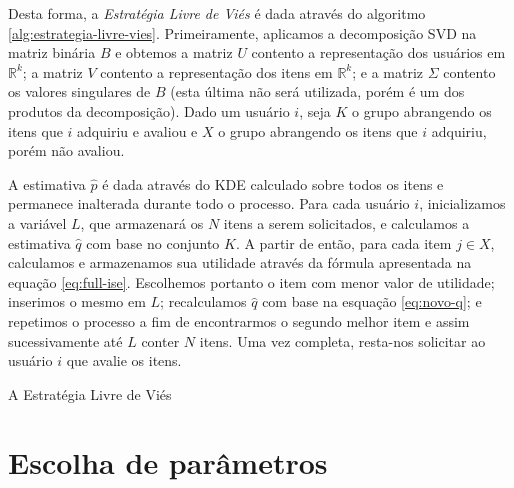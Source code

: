 Desta forma, a \textit{Estratégia Livre de Viés} é dada através do algoritmo \ref{alg:estrategia-livre-vies}. Primeiramente, aplicamos a decomposição SVD na matriz binária $B$ e obtemos a matriz $U$ contento a representação dos usuários em $\mathbb{R}^k$; a matriz $V$ contento a representação dos itens em $\mathbb{R}^k$; e a matriz $\Sigma$ contento os valores singulares de $B$ (esta última não será utilizada, porém é um dos produtos da decomposição). Dado um usuário $i$, seja $K$ o grupo abrangendo os itens que $i$ adquiriu e avaliou e $X$ o grupo abrangendo os itens que $i$ adquiriu, porém não avaliou.

A estimativa $\hat{p}$ é dada através do KDE calculado sobre todos os itens e permanece inalterada durante todo o processo. Para cada usuário $i$, inicializamos a variável $L$, que armazenará os $N$ itens a serem solicitados, e calculamos a estimativa $\hat{q}$ com base no conjunto $K$. A partir de então, para cada item $j \in X$, calculamos e armazenamos sua utilidade através da fórmula apresentada na equação \ref{eq:full-ise}. Escolhemos portanto o item com menor valor de utilidade; inserimos o mesmo em $L$; recalculamos $\hat{q}$ com base na esquação \ref{eq:novo-q}; e repetimos o processo a fim de encontrarmos o segundo melhor item e assim sucessivamente até $L$ conter $N$ itens. Uma vez completa, resta-nos solicitar ao usuário $i$ que avalie os itens.

\begin{algorithm}
\caption{A Estratégia Livre de Viés} 
\begin{algorithmic}[1]
        \EndFor
    \EndWhile
\EndFor
\end{algorithmic}
\label{alg:estrategia-livre-vies}
\end{algorithm}

\section{Escolha de parâmetros}
\label{sec:parametrizacao}

